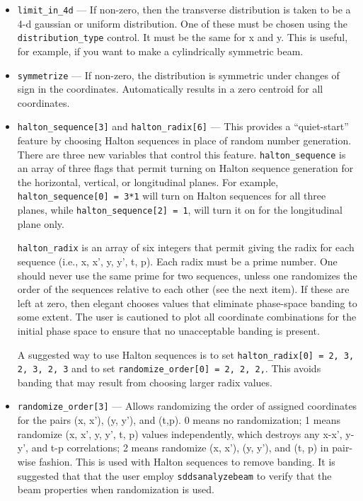 \documentclass[11pt]{article}
\begin{document}
\begin{itemize}
\item \verb|limit_in_4d| --- If non-zero, then the transverse
distribution is taken to be a 4-d gaussian or uniform distribution.
One of these must be chosen using the \verb|distribution_type|
control.  It must be the same for x and y.  This is useful, for
example, if you want to make a cylindrically symmetric beam.

\item \verb|symmetrize| --- If non-zero, the distribution is symmetric
under changes of sign in the coordinates.  Automatically results in a
zero centroid for all coordinates.

\item \verb|halton_sequence[3]| and \verb|halton_radix[6]| --- This
provides a ``quiet-start'' feature by choosing Halton sequences in
place of random number generation.  There are three new variables that
control this feature.  \verb|halton_sequence| is an array of three
flags that permit turning on Halton sequence generation for the
horizontal, vertical, or longitudinal planes.  For example,
\verb|halton_sequence[0] = 3*1| will turn on Halton sequences for all
three planes, while \verb|halton_sequence[2] = 1|, will turn it on for
the longitudinal plane only.

\verb|halton_radix| is an array of six integers that permit giving the
radix for each sequence (i.e., x, x', y, y', t, p).  Each radix must
be a prime number.  One should never use the same prime for two
sequences, unless one randomizes the order of the sequences relative to
each other (see the next item).  If these are left at zero, then
elegant chooses values that eliminate phase-space banding to some
extent.  The user is cautioned to plot all coordinate combinations for
the initial phase space to ensure that no unacceptable banding is
present.

A suggested way to use Halton sequences is to set
\verb|halton_radix[0] = 2, 3, 2, 3, 2, 3| and
to set 
\verb|randomize_order[0] = 2, 2, 2,|.  This avoids banding that may
result from choosing larger radix values.

\item \verb|randomize_order[3]| --- Allows randomizing the order of
assigned coordinates for the pairs (x, x'), (y, y'), and (t,p).  0
means no randomization; 1 means randomize (x, x', y, y', t, p) values
independently, which destroys any x-x', y-y', and t-p correlations; 2
means randomize (x, x'), (y, y'), and (t, p) in pair-wise fashion.
This is used with Halton sequences to remove banding.  It is suggested
that that the user employ \verb|sddsanalyzebeam| to verify that the
beam properties when randomization is used.


\end{itemize}
\end{document}

